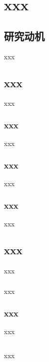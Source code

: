 \cleardoublepage            %
\pagestyle{mainstyle}       %

\section{xxx}
\subsection{研究动机}
xxx

\subsection{xxx}
xxx

\subsubsection{xxx}
xxx

\subsubsection{xxx}
xxx

\subsubsection{xxx}
xxx

\subsection{xxx}
xxx

\subsubsection{}
xxx

\subsubsection{xxx}
xxx

\subsection{}
xxx

\clearpage        %
